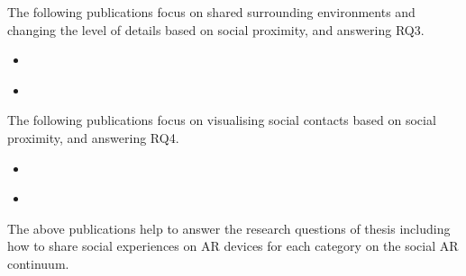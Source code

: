 The following publications focus on shared surrounding environments and changing the level of details based on social proximity, and answering RQ3.

\begin{itemize}
    \item{ }
    \item{ }
\end{itemize}

The following publications focus on visualising social contacts based on social proximity, and answering RQ4. 

\begin{itemize}
    \item{ }
    \item{ }
\end{itemize}

The above publications help to answer the research questions of thesis including how to share social experiences on AR devices for each category on the social AR continuum. 


